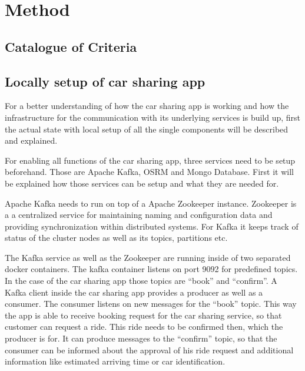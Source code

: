 
\chapter{Method}

\section{Catalogue of Criteria}

\section{Locally setup of car sharing app}

For a better understanding of how the car sharing app is working and how the infrastructure for the communication with its underlying services is build up, first the   actual state with local setup of all the single components will be described and explained.

For enabling all functions of the car sharing app, three services need to be setup beforehand. Those are Apache Kafka, OSRM and Mongo Database. First it will be explained how those services can be setup and what they are needed for.

Apache Kafka needs to run on top of a Apache Zookeeper instance. Zookeeper is a a centralized service for maintaining naming and configuration data and providing synchronization within distributed systems. For Kafka it keeps track of status of the cluster nodes as well as its topics, partitions etc.


The Kafka service as well as the Zookeeper are running inside of two separated docker containers. The kafka container listens on port 9092 for predefined topics. In the case of the car sharing app those topics are ``book'' and ``confirm''. A Kafka client inside the car sharing app provides a producer as well as a consumer. The consumer listens on new messages for the ``book'' topic. This way the app is able to receive booking request for the car sharing service, so that customer can request a ride. This ride needs to be confirmed then, which the producer is for. It can produce messages to the ``confirm'' topic, so that the consumer can be informed about the approval of his ride request and additional information like estimated arriving time or car identification.

